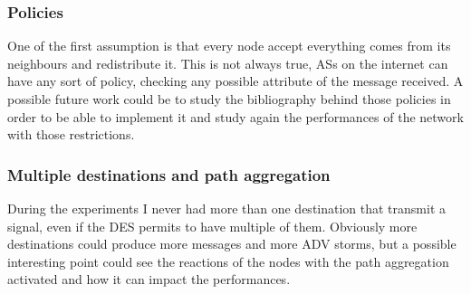\subsubsection{Policies}

One of the first assumption is that every node accept everything comes from its
neighbours and redistribute it.
This is not always true, \acp{AS} on the internet can have any sort of policy, 
checking any possible attribute of the message received.
A possible future work could be to study the bibliography behind those policies
in order to be able to implement it and study again the performances of 
the network with those restrictions.

\subsubsection{Multiple destinations and path aggregation}

During the experiments I never had more than one destination that transmit a 
signal, even if the \ac{DES} permits to have multiple of them.
Obviously more destinations could produce more messages and more \ac{ADV}
storms, but a possible interesting point could see the reactions of the nodes
with the path aggregation activated and how it can impact the performances.
